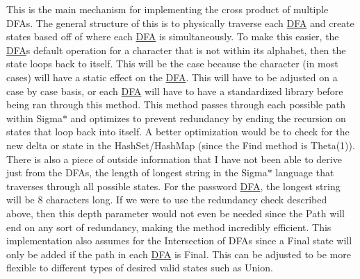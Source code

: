 This is the main mechanism for implementing the cross product of multiple D\+F\+As. The general structure of this is to physically traverse each \mbox{\hyperlink{class_d_f_a}{D\+FA}} and create states based off of where each \mbox{\hyperlink{class_d_f_a}{D\+FA}} is simultaneously. To make this easier, the \mbox{\hyperlink{class_d_f_a}{D\+FA}}\textquotesingle{}s default operation for a character that is not within its alphabet, then the state loops back to itself. This will be the case because the character (in most cases) will have a static effect on the \mbox{\hyperlink{class_d_f_a}{D\+FA}}. This will have to be adjusted on a case by case basis, or each \mbox{\hyperlink{class_d_f_a}{D\+FA}} will have to have a standardized library before being ran through this method. This method passes through each possible path within Sigma$\ast$ and optimizes to prevent redundancy by ending the recursion on states that loop back into itself. A better optimization would be to check for the new delta or state in the Hash\+Set/\+Hash\+Map (since the Find method is Theta(1)). There is also a piece of outside information that I have not been able to derive just from the D\+F\+As, the length of longest string in the Sigma$\ast$ language that traverses through all possible states. For the password \mbox{\hyperlink{class_d_f_a}{D\+FA}}, the longest string will be 8 characters long. If we were to use the redundancy check described above, then this depth parameter would not even be needed since the Path will end on any sort of redundancy, making the method incredibly efficient. This implementation also assumes for the Intersection of D\+F\+As since a Final state will only be added if the path in each \mbox{\hyperlink{class_d_f_a}{D\+FA}} is Final. This can be adjusted to be more flexible to different types of desired valid states such as Union.


